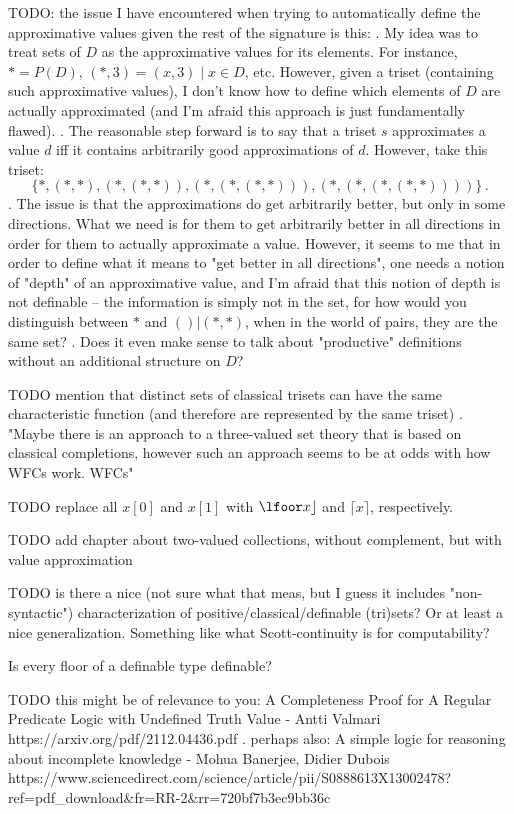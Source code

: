 \documentclass[oneside,12pt]{book}
\theoremstyle{definition}
\theoremstyle{remark}
\begin{document}
TODO: the issue I have encountered when trying to automatically define
the approximative values given the rest of the signature is this:
.
My idea was to treat sets of $D$ as the approximative values for its elements.
For instance, $* = P(D)$, $(*, 3) = { (x, 3) \mid x \in D }$, etc. However,
given a triset (containing such approximative values), I don't know how
to define which elements of $D$ are actually approximated (and I'm afraid
this approach is just fundamentally flawed).
.
The reasonable step forward is to say that a triset $s$ approximates a value $d$
iff it contains arbitrarily good approximations of $d$. However, take this
triset: \[\{ *, (*, *), (*, (*, *)), (*, (*, (*, *))), (*, (*, (*, (*, *)))) \}\,.\]
.
The issue is that the approximations do get arbitrarily better, but only in
some directions. What we need is for them to get arbitrarily better in all
directions in order for them to actually approximate a value. However, it
seems to me that in order to define what it means to "get better in all
directions", one needs a notion of "depth" of an approximative value, and I'm
afraid that this notion of depth is not definable -- the information
is simply not in the set, for how would you distinguish between $*$ and
$() | (*, *)$, when in the world of pairs, they are the same set?
.
Does it even make sense to talk about "productive" definitions without
an additional structure on $D$?

TODO mention that distinct sets of classical trisets can have the same characteristic
function (and therefore are represented by the same triset)
.
"Maybe there is an approach to a three-valued set theory that is based on classical
completions, however such an approach seems to be at odds with how WFCs work.
WFCs"

TODO replace all $x[0]$ and $x[1]$ with $\lfoor x \rfloor$ and $\lceil x \rceil$, respectively.

TODO add chapter about two-valued collections, without complement, but with value
approximation

TODO is there a nice (not sure what that meas, but I guess it includes "non-syntactic")
characterization of positive/classical/definable (tri)sets? Or at least a nice generalization.
Something like what Scott-continuity is for computability?

Is every floor of a definable type definable?

TODO this might be of relevance to you:
A Completeness Proof for A Regular Predicate Logic with Undefined Truth Value - Antti Valmari
https://arxiv.org/pdf/2112.04436.pdf
.
perhaps also:
A simple logic for reasoning about incomplete knowledge - Mohua Banerjee, Didier Dubois
https://www.sciencedirect.com/science/article/pii/S0888613X13002478?ref=pdf_download&fr=RR-2&rr=720bf7b3ec9bb36c
\end{document}
